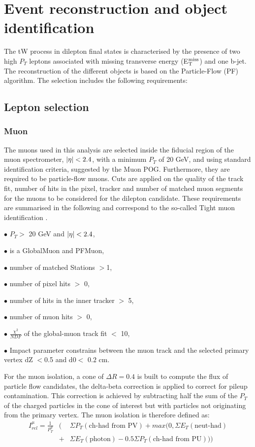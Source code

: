 \clearpage
\section{Event reconstruction and object identification}
\label{tW_Objectselection}
The tW  process in dilepton final states is characterised by the presence of two high $P_{T}$ leptons associated with missing transverse energy (E$_{\rm T}^{\rm miss}$) and one b-jet.
The reconstruction of the different objects is based on the Particle-Flow (PF) algorithm. The selection includes the following requirements:

\subsection{Lepton selection}
\subsubsection{Muon}

The muons used in this analysis  are selected inside the fiducial region of the muon
spectrometer, $|{\eta}|<  2.4$, with a minimum $P_{T}$  of 20 GeV, and using standard identification criteria, suggested by the Muon POG. Furthermore, they are required to be particle-flow muons.
Cuts are applied on the quality of the track fit, number of hits in the pixel, tracker and number
of matched muon segments for the muons to be considered for the dilepton candidate. These
requirements are summarised in the following and correspond to the so-called Tight muon identification \cite{muonid}.

$\bullet$ $P_{T}>$ 20 GeV and $|{\eta}|<  2.4$,

$\bullet$ is a GlobalMuon and PFMuon,

$\bullet$ number of matched Stations $> $1,

$\bullet$ number of pixel hits $>$ 0,

$\bullet$ number of hits in the inner tracker $>$ 5,

$\bullet$ number of muon hits $>$ 0,

$\bullet$ $\frac{\chi^2}{NDF}$ of the global-muon track fit $<$ 10,

$\bullet$ Impact parameter constrains between the muon track and the selected primary vertex dZ $<$0.5  and d0$<$ $0.2$ cm.


For the muon isolation, a cone of $\Delta R = 0.4$ is built to
compute the flux of particle flow candidates, the delta-beta correction is applied to correct
for pileup contamination. This correction is achieved by subtracting half the sum of the $P_{T}$ of
the charged particles in the cone of interest but with particles not originating from the primary
vertex.
The muon isolation is therefore defined as:
\begin{eqnarray}
\label{eq:Irel}
I_{rel}^{\mu} = \frac{1}{P_{T}^{\mu}} &(&\Sigma P_{T}(\text{ch-had from PV}) + max(0,\Sigma E_{T}(\text{neut-had}) \nonumber \\
&+&  \Sigma E_{T}(\text{photon}) - 0.5 \Sigma P_{T}(\text{ch-had from PU})))
\end{eqnarray}

